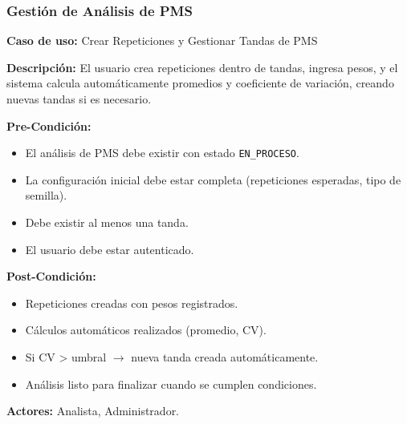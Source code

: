 \subsubsection{Gestión de Análisis de PMS}

\noindent\textbf{Caso de uso:} Crear Repeticiones y Gestionar Tandas de PMS

\vspace{0.5em}
\noindent\textbf{Descripción:} El usuario crea repeticiones dentro de tandas, ingresa pesos, y el sistema calcula automáticamente promedios y coeficiente de variación, creando nuevas tandas si es necesario.

\vspace{0.5em}
\noindent\textbf{Pre-Condición:}
\begin{itemize}[nosep]
    \item El análisis de PMS debe existir con estado \texttt{EN\_PROCESO}.
    \item La configuración inicial debe estar completa (repeticiones esperadas, tipo de semilla).
    \item Debe existir al menos una tanda.
    \item El usuario debe estar autenticado.
\end{itemize}

\vspace{0.5em}
\noindent\textbf{Post-Condición:}
\begin{itemize}[nosep]
    \item Repeticiones creadas con pesos registrados.
    \item Cálculos automáticos realizados (promedio, CV).
    \item Si CV > umbral $\rightarrow$ nueva tanda creada automáticamente.
    \item Análisis listo para finalizar cuando se cumplen condiciones.
\end{itemize}

\vspace{0.5em}
\noindent\textbf{Actores:} Analista, Administrador.

